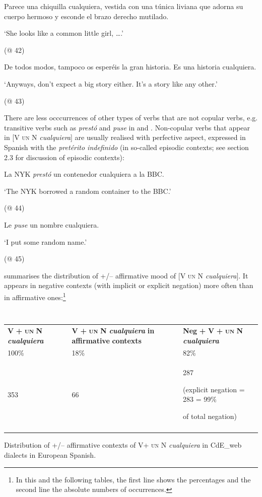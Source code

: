 \label{bkm:Ref42868883}  Parece una chiquilla cualquiera, vestida con una túnica liviana que adorna su cuerpo hermoso y esconde el brazo derecho mutilado.

  ‘She looks like a common little girl, ….’ 

  (@ 42)

\label{bkm:Ref42868888}  De todos modos, tampoco os esperéis la gran historia. Es una historia cualquiera.

  ‘Anyways, don’t expect a big story either. It’s a story like any other.’

  (@ 43) 

There are less occcurrences of other types of verbs that are not copular verbs, e.g. transitive verbs such as \textit{prestó} and \textit{puse} in  and . Non-copular verbs that appear in [V \textsc{un} N \textit{cualquiera}] are usually realised with perfective aspect, expressed in Spanish with the \textit{pretérito indefinido} (in so-called episodic contexts; see section 2.3 for discussion of episodic contexts):

\label{bkm:Ref42868870}  La NYK \textit{prestó} un contenedor cualquiera a la BBC.

  ‘The NYK borrowed a random container to the BBC.’

  (@ 44)

\label{bkm:Ref42869017}  Le \textit{puse} un nombre cualquiera. 

  ‘I put some random name.’

  (@ 45)

 summarises the distribution of +/– affirmative mood of [V \textsc{un} N \textit{cualquiera}]. It appears in negative contexts (with implicit or explicit negation) more often than in affirmative ones:\footnote{In this and the following tables, the first line shows the percentages and the second line the absolute numbers of occurrences.} 


\begin{table}
\begin{tabularx}{\textwidth}{XXX}
\lsptoprule
 \textbf{V} \textbf{+} \textbf{\textsc{un}} \textbf{N} \textbf{\textit{cualquiera}} & \textbf{V} \textbf{+} \textbf{\textsc{un}} \textbf{N} \textbf{\textit{cualquiera}} \textbf{in} \textbf{affirmative} \textbf{contexts} & \textbf{Neg} \textbf{+} \textbf{V} \textbf{+} \textbf{\textsc{un}} \textbf{N} \textbf{\textit{cualquiera}}\\
 100\% & 18\% & 82\%\\
 353 & 66 & { 287}

{ (explicit negation = 283 = 99\%}

 of total negation)\\
\lspbottomrule
\end{tabularx}
\caption{\label{tab:} ~}Distribution of +/– affirmative contexts of V+ \textsc{un} N \textit{cualquiera} in CdE\_web dialects in European Spanish.
\end{table}

